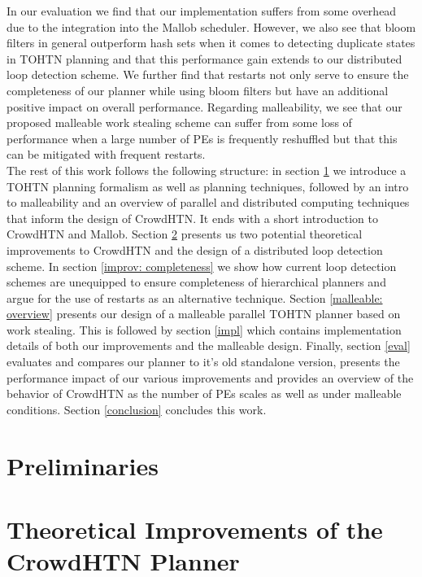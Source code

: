 \documentclass[enabledeprecatedfontcommands,12pt,a4paper,twoside]{scrartcl}
\numberwithin{equation}{section}
\begin{document}
In our evaluation we find that our implementation suffers from some overhead due to the integration into the Mallob scheduler.
However, we also see that bloom filters in general outperform hash sets when it comes to detecting duplicate states in TOHTN planning and that this performance gain extends to our distributed loop detection scheme. We further find that restarts not only serve to ensure the completeness of our planner while using bloom filters but have an additional positive impact on overall performance. Regarding malleability, we see that our proposed malleable work stealing scheme can suffer from some loss of performance when a large number of PEs is frequently reshuffled but that this can be mitigated with frequent restarts. \\

The rest of this work follows the following structure: in section \ref{prelim} we introduce a TOHTN planning formalism as well as planning techniques, followed by an intro to malleability and an overview of parallel and distributed computing techniques that inform the design of CrowdHTN. It ends with a short introduction to CrowdHTN and Mallob. Section \ref{improv} presents us two potential theoretical improvements to CrowdHTN and the design of a distributed loop detection scheme. In section \ref{improv: completeness} we show how current loop detection schemes are unequipped to ensure completeness of hierarchical planners and argue for the use of restarts as an alternative technique. Section \ref{malleable: overview} presents our design of a malleable parallel TOHTN planner based on work stealing. This is followed by section \ref{impl} which contains implementation details of both our improvements and the malleable design. Finally, section \ref{eval} evaluates and compares our planner to it's old standalone version, presents the performance impact of our various improvements and provides an overview of the behavior of CrowdHTN as the number of PEs scales as well as under malleable conditions. Section \ref{conclusion} concludes this work.
	
\clearpage
\pagebreak
\section{Preliminaries}
\label{prelim}







\clearpage
\pagebreak
\section{Theoretical Improvements of the CrowdHTN Planner}
\label{improv}
\todo{}


\end{document}
